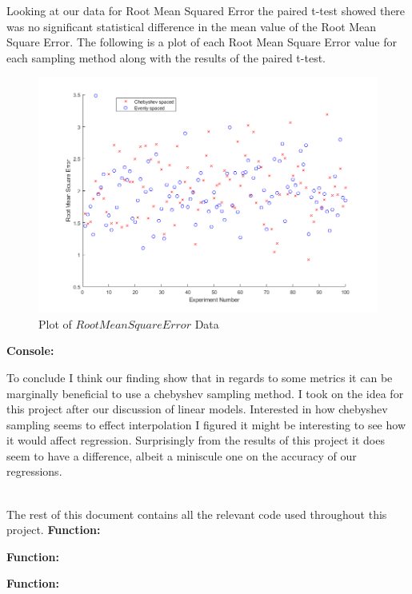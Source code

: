 \documentclass[12pt]{article}
\theoremstyle{homework}
\begin{document}
  Looking at our data for Root Mean Squared Error the paired t-test showed there was no significant statistical difference in the mean value of the Root Mean Square Error. The following is a plot of 
  each Root Mean Square Error value for each sampling method along with the results of the paired t-test.\\ 
  \begin{figure}[H]
    \caption{Plot of $Root Mean Square Error$ Data}
    \includegraphics[width = \textwidth]{RMSE.png}  
    \centering
  \end{figure}
  \textbf{Console:}
  \begin{center}
  
  \end{center}

  To conclude I think our finding show that in regards to some metrics it can be marginally beneficial to use a chebyshev sampling method. I took on the idea for this project after our discussion of linear models. 
  Interested in how chebyshev sampling seems to effect interpolation I figured it might be interesting to see how it would affect regression. Surprisingly from the results of this project it does seem to have a
  difference, albeit a miniscule one on the accuracy of our regressions. \\\\
  
  \newpage

  The rest of this document contains all the relevant code used throughout this project. 
  \textbf{Function:}
  \begin{center}
  
  \end{center}
  
  \newpage
  \textbf{Function:}
  \begin{center}
  
  \end{center}

  \newpage
  \textbf{Function:}
  \begin{center}
  
  \end{center}
\end{document}
